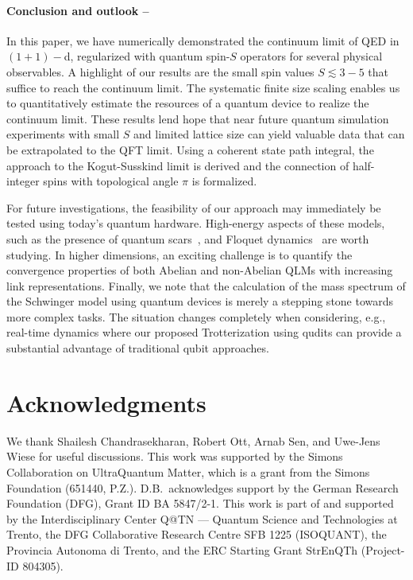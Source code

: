 \documentclass[aps,prl,reprint,twocolumn,superscriptaddress,floatfix,nofootinbib]{revtex4-1}
\begin{document}
	
	\paragraph{Conclusion and outlook --}
	In this paper, we have numerically demonstrated the continuum limit of QED in $(1+1)-$d, regularized with quantum spin-$S$ operators for several physical observables. A highlight of our results are the small spin values $S\lesssim 3-5$ that suffice to reach the continuum limit. The systematic finite size scaling enables us to quantitatively estimate the resources of a quantum device to realize the continuum limit. These results lend hope that near future quantum simulation experiments with small $S$ and limited lattice size can yield valuable data that can be extrapolated to the QFT limit. Using a coherent state path integral, the approach to the Kogut-Susskind limit is derived and the connection of half-integer spins with topological angle $\pi$ is formalized.
	
	For future investigations, the feasibility of our approach may immediately be tested using today's quantum hardware. High-energy aspects of these models, such as the presence of quantum scars~\cite{ho2019periodic}, and Floquet dynamics~\cite{Mukherjee2020,Mukh2} are worth studying. In higher dimensions, an exciting challenge is to quantify the convergence properties of both Abelian and non-Abelian QLMs with increasing link representations. Finally, we note that the calculation of the mass spectrum of the Schwinger model using quantum devices is merely a stepping stone towards more complex tasks. The situation changes completely when considering, e.g., real-time dynamics where our proposed Trotterization using qudits can provide a substantial advantage of traditional qubit approaches.
	
	
	\section{Acknowledgments}
	We thank Shailesh Chandrasekharan, Robert Ott, Arnab Sen, and Uwe-Jens Wiese for useful discussions. This work was supported by the Simons Collaboration on UltraQuantum Matter, which is a grant from the Simons Foundation (651440, P.Z.). D.B.~acknowledges support by the German Research Foundation (DFG), Grant ID BA 5847/2-1. This work is part of and supported by the Interdisciplinary Center Q@TN — Quantum Science and Technologies at Trento, the DFG Collaborative Research Centre SFB 1225 (ISOQUANT), the Provincia Autonoma di Trento, and the ERC Starting Grant StrEnQTh (Project- ID 804305).
	
\end{document}
